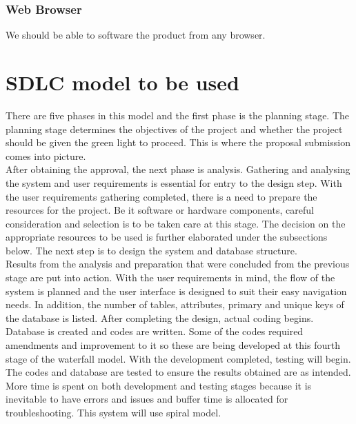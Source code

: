 \subsubsection{Web Browser}
We should be able to software the product from any browser.


\section{SDLC model to be used}
There are five phases in this model and the first phase is the planning stage.  The planning
stage determines the objectives of the project and whether the project should be given the
green  light  to  proceed.   This  is  where  the  proposal  submission  comes  into  picture.\\
\noindent After
obtaining the approval, the next phase is analysis.  Gathering and analysing the system and
user requirements is essential for entry to the design step.
With the user requirements gathering completed, there is a need to prepare the resources
for the project.  Be it software or hardware components, careful consideration and selection
is to be taken care at this stage.  The decision on the appropriate resources to be used is
further elaborated under the subsections below.  The next step is to design the system and
database structure.\\ 
\noindent Results from the analysis and preparation that were concluded from the previous stage are
put into action.  With the user requirements in mind, the flow of the system is planned and
the user interface is designed to suit their easy navigation needs.  In addition, the number of
tables, attributes, primary and unique keys of the database is listed.
After  completing  the  design,  actual  coding  begins.   Database  is  created  and  codes  are
written.  Some of the codes required amendments and improvement to it so these are being
developed  at  this  fourth  stage  of  the  waterfall  model.   With  the  development  completed,
testing will begin.\\ 
\noindent The codes and database are tested to ensure the results obtained are as
intended.  More time is spent on both development and testing stages because it is inevitable
to have errors and issues and buffer time is allocated for troubleshooting.
This system will use spiral model.

